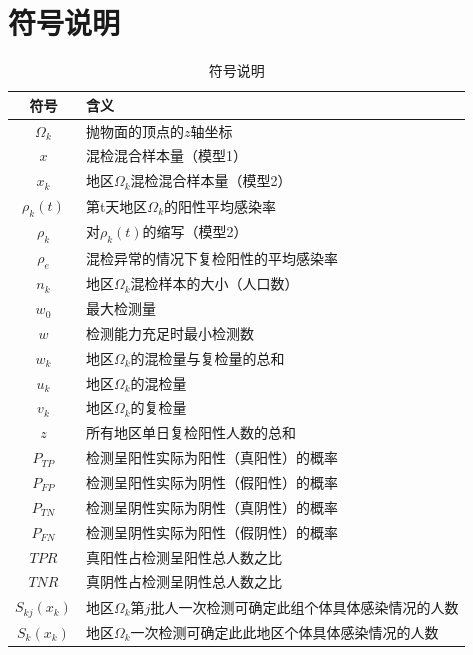 \documentclass[withoutpreface,bwprint]{cumcmthesis} %
\begin{document}
\section{符号说明}
\begin{table}[H] %
    \begin{center} %
    \caption{符号说明} %
    \begin{tabular}{cl} %
        \toprule %
        \multicolumn{1}{m{3cm}}{\centering 符号} %
        & \multicolumn{1}{m{10cm}}{ 含义} %
        \\ %
        \midrule %
        $\Omega_k$	&抛物面的顶点的$z$轴坐标\\
        $x$	&混检混合样本量（模型1）\\
        $x_k$  &地区$\Omega_k$混检混合样本量（模型2）\\
        $\rho_k(t)$	&第t天地区$\Omega_k$的阳性平均感染率\\
        $\rho_k$    &对$\rho_k(t)$的缩写（模型2） \\
        $\rho_e$	&混检异常的情况下复检阳性的平均感染率\\
        $n_k$       &地区$\Omega_k$混检样本的大小（人口数）\\
        $w_0$       &最大检测量\\
        $w$	        &检测能力充足时最小检测数\\
        $w_k$       &地区$\Omega_k$的混检量与复检量的总和 \\
        $u_k$       &地区$\Omega_k$的混检量\\
        $v_k$       &地区$\Omega_k$的复检量\\
        $z$         &所有地区单日复检阳性人数的总和\\
        $P_{TP}$    &检测呈阳性实际为阳性（真阳性）的概率\\
        $P_{FP}$    &检测呈阳性实际为阴性（假阳性）的概率\\
        $P_{TN}$    &检测呈阴性实际为阴性（真阴性）的概率\\
        $P_{FN}$    &检测呈阴性实际为阳性（假阴性）的概率\\
        $TPR$       &真阳性占检测呈阳性总人数之比 \\
        $TNR$       &真阴性占检测呈阴性总人数之比 \\
        $S_{kj}(x_k)$ &地区$\Omega_k$第$j$批人一次检测可确定此组个体具体感染情况的人数 \\
        $S_{k}(x_k)$ &地区$\Omega_k$一次检测可确定此此地区个体具体感染情况的人数\\
         \bottomrule
        \end{tabular} \label{tb:符号说明}%
    \end{center} %
\end{table} %
\end{document}
